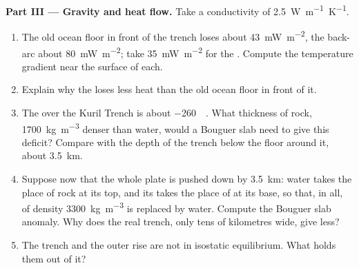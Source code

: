 \begin{problem}
\medskip
\noindent\textbf{Part III --- Gravity and heat flow.} Take a conductivity of
\qty{2.5}{W.m^{-1}.K^{-1}}.
\begin{enumerate}[resume]
  \item The old ocean floor in front of the trench loses about
        \qty{43}{mW.m^{-2}}, the back-arc about \qty{80}{mW.m^{-2}}; take
        \qty{35}{mW.m^{-2}} for the . Compute the temperature gradient
        near the surface of each.
  \item Explain why the  loses less heat than the old ocean floor in
        front of it.
  \item The  over the Kuril Trench is about
        \qty{-260}{\milli\gal}. What thickness of rock, \qty{1700}{kg.m^{-3}}
        denser than water, would a Bouguer slab need to give this deficit?
        Compare with the depth of the trench below the floor around it,
        about \qty{3.5}{km}.
  \item Suppose now that the whole plate is pushed down by \qty{3.5}{km}:
        water takes the place of rock at its top, and its  takes the
        place of  at its base, so that, in all,  of density
        \qty{3300}{kg.m^{-3}} is replaced by water. Compute the Bouguer slab
        anomaly. Why does the real trench, only tens of kilometres wide, give
        less?
  \item The trench and the outer rise are not in isostatic equilibrium. What
        holds them out of it?
\end{enumerate}


\end{problem}
